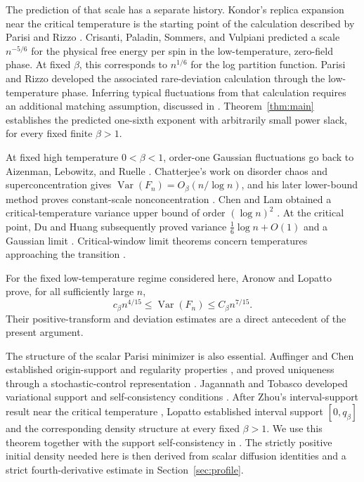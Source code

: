 The prediction of that scale has a separate history. Kondor's replica
expansion near the critical temperature \cite{Kondor1983} is the starting
point of the calculation described by Parisi and Rizzo
\cite{ParisiRizzo2008,ParisiRizzo2009}. Crisanti, Paladin, Sommers, and
Vulpiani \cite{CPSV1992} predicted a scale $n^{-5/6}$ for the physical
free energy per spin in the low-temperature, zero-field phase. At fixed
$\beta$, this corresponds to $n^{1/6}$ for the log partition function.
Parisi and Rizzo developed the associated rare-deviation calculation
through the low-temperature phase. Inferring typical fluctuations from
that calculation requires an additional matching assumption, discussed
in \cite[Section~VI]{ParisiRizzo2009}.
Theorem~\ref{thm:main} establishes the predicted one-sixth exponent with
arbitrarily small power slack, for every fixed finite $\beta>1$.

At fixed high temperature $0<\beta<1$, order-one Gaussian fluctuations
go back to Aizenman, Lebowitz, and Ruelle
\cite{AizenmanLebowitzRuelle1987}. Chatterjee's work on disorder chaos
and superconcentration \cite[Theorem~1.5]{Chatterjee2009} gives
$\operatorname{Var}(F_n)=O_\beta(n/\log n)$, and his later lower-bound
method proves constant-scale nonconcentration
\cite[Theorem~2.4]{Chatterjee2019LowerBounds}.
Chen and Lam obtained a critical-temperature variance upper bound of
order $(\log n)^2$ \cite{ChenLam2019Critical}. At the critical point,
Du and Huang subsequently proved variance $\frac16\log n+O(1)$ and
a Gaussian limit \cite[Theorem~1.3]{DuHuang2026Critical}.
Critical-window limit theorems concern temperatures approaching the
transition
\cite{ChengLiuShaoXu2026CriticalWindow}.

For the fixed low-temperature regime considered here, Aronow and Lopatto
\cite[Theorem~1.4]{AL2026} prove, for all sufficiently large $n$,
\[
 c_\beta n^{4/15}\le \operatorname{Var}(F_n)
                         \le C_\beta n^{7/15}.
\]
Their positive-transform and deviation estimates are a direct
antecedent of the present argument.

The structure of the scalar Parisi minimizer is also essential.
Auffinger and Chen established origin-support and regularity properties
\cite{AuffingerChenProperties2015}, and proved uniqueness through a
stochastic-control representation \cite{AuffingerChenUniqueness2015}.
Jagannath and Tobasco developed variational support and self-consistency
conditions \cite{JagannathTobasco2017}. After Zhou's interval-support
result near the critical temperature \cite{Zhou2025}, Lopatto
\cite[Theorem~1.1]{Lopatto2026} established interval support $[0,q_\beta]$
and the corresponding density structure at every fixed $\beta>1$.
We use this theorem together with the support self-consistency in
\cite[Lemma~2.2]{Lopatto2026}. The strictly positive initial density
needed here is then derived from scalar
diffusion identities and a strict fourth-derivative estimate in
Section~\ref{sec:profile}.

